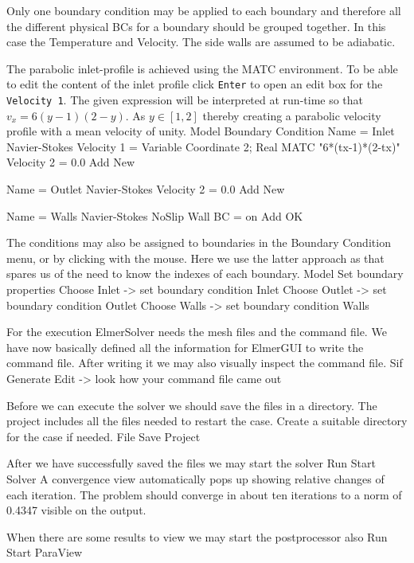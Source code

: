 Only one boundary condition may be applied to each boundary and therefore all the 
different physical BCs for a boundary should be grouped together. In this case the
Temperature and Velocity. The side walls are assumed to be adiabatic.

The parabolic inlet-profile is achieved using the 
MATC environment. To be able to edit the content of the inlet profile 
click \texttt{Enter} to open an edit box for the \texttt{Velocity 1}. The given expression will be 
interpreted at run-time so that $v_x=6(y-1)(2-y)$. As $y\in[1,2]$ thereby
creating a parabolic velocity profile with a mean velocity of unity. 
\ttbegin
Model
  Boundary Condition
    Name = Inlet
    Navier-Stokes 
      Velocity 1 = Variable Coordinate 2; Real MATC "6*(tx-1)*(2-tx)"
      Velocity 2 = 0.0
    Add
    New

    Name = Outlet
    Navier-Stokes 
      Velocity 2 = 0.0
    Add 
    New
 
    Name = Walls
    Navier-Stokes 
      NoSlip Wall BC = on
    Add
    OK
\ttend   

The conditions may also be assigned to boundaries in the Boundary Condition menu, or
by clicking with the mouse. Here we use the latter approach as that spares us of the 
need to know the indexes of each boundary.
\ttbegin
Model
  Set boundary properties
    Choose Inlet -> set boundary condition Inlet
    Choose Outlet -> set boundary condition Outlet
    Choose Walls -> set boundary condition Walls
\ttend

For the execution 
ElmerSolver needs the mesh files and the command file. We have now basically defined
all the information for ElmerGUI to write the command file. After writing it we may also visually 
inspect the command file.
\ttbegin
Sif 
  Generate
  Edit -> look how your command file came out  
\ttend

Before we can execute the solver we should save the files in a directory. The project includes
all the files needed to restart the case. Create a suitable directory for the case if needed. 
\ttbegin
File 
  Save Project
\ttend

After we have successfully saved the files we may start the solver
\ttbegin
Run
  Start Solver
\ttend
A convergence view automatically pops up showing relative changes of each iteration.
The problem should converge in about ten iterations to a norm of 0.4347 visible on the output.

When there are some results to view we may start the postprocessor also
\ttbegin
Run
  Start ParaView
\ttend


